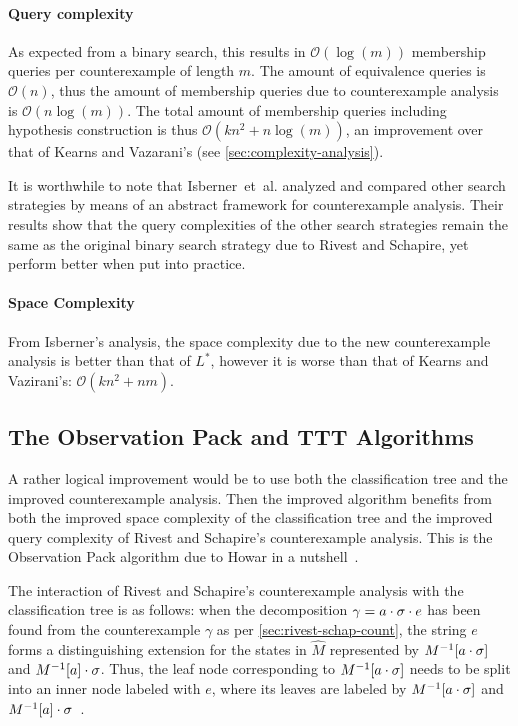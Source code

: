 \documentclass[multi,crop=false,class=article]{standalone}
\begin{document}
\paragraph{Query complexity} As expected from a binary search, this results in
$\mathcal{O}(\log(m))$ membership queries per counterexample of length $m$. The
amount of equivalence queries is $\mathcal{O}(n)$, thus the amount of membership
queries due to counterexample analysis is $\mathcal{O}(n\log(m))$. The total
amount of membership queries including hypothesis construction is thus
$\mathcal{O}(kn^2 + n\log(m))$, an improvement over that of Kearns and
Vazarani's (see \cref{sec:complexity-analysis}).

It is worthwhile to note that Isberner~et~al. analyzed and compared other search
strategies by means of an abstract framework for counterexample
analysis\cite{Isberner2014a}. Their results show that the query complexities of
the other search strategies remain the same as the original binary search
strategy due to Rivest and Schapire, yet perform better when put into practice.

\paragraph{Space Complexity} From Isberner's analysis\cite{Isberner2014b}, the
space complexity due to the new counterexample analysis is better than that of
$L^*$, however it is worse than that of Kearns and Vazirani's:
$\mathcal{O}(kn^2 + nm)$.

\subsection{The Observation Pack and TTT Algorithms}
\label{sec:ttt}
A rather logical improvement would be to use both the classification tree and
the improved counterexample analysis. Then the improved algorithm benefits from
both the improved space complexity of the classification tree and the improved
query complexity of Rivest and Schapire's counterexample analysis. This is the
Observation Pack algorithm due to Howar in a
nutshell~\cite{Howar2012a,Isberner2015a}.

The interaction of Rivest and Schapire's counterexample analysis with the
classification tree is as follows: when the decomposition
$\gamma = a \cdot \sigma \cdot e$ has been found from the counterexample
$\gamma$ as per \cref{sec:rivest-schap-count}, the string $e$ forms a
distinguishing extension for the states in $\hat M$ represented by
$M^{-1}[a\cdot\sigma]$ and $M^{-1}[a]\cdot\sigma$. Thus, the leaf
node corresponding to $M^{-1}[a\cdot\sigma]$ needs to be split into an
inner node labeled with $e$, where its leaves are labeled by
$M^{-1}[a\cdot\sigma]$ and
$M^{-1}[a]\cdot\sigma$~\cite{Isberner2015a}.
\end{document}
